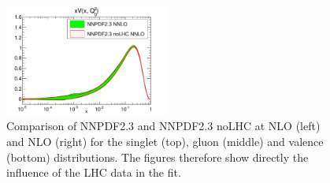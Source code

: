 \begin{figure}[hp!]
\includegraphics[width=0.48\textwidth]{6-LHCimpact/figs/xV_Q_2_log-23-vs-23noLHC-nnlo.pdf}
\caption[Comparison of NNPDF2.3 and NNPDF2.3 noLHC at NLO and NLO for the singlet, gluon and valence distributions]{Comparison of NNPDF2.3 and NNPDF2.3 noLHC at NLO (left) and NLO (right) for the singlet (top), gluon (middle) and valence (bottom) distributions. The figures therefore show directly the influence of the LHC data in the fit.}
\label{fig:23vs23noLHC}
\end{figure}


